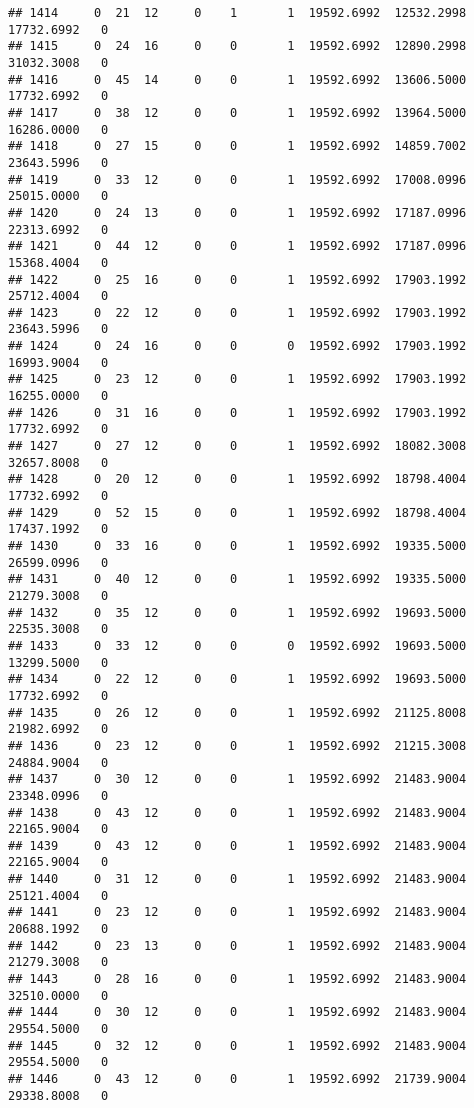 \documentclass[
]{article}
\begin{document}
\begin{enumerate}
\begin{verbatim}
## 1414     0  21  12     0    1       1  19592.6992  12532.2998  17732.6992   0
## 1415     0  24  16     0    0       1  19592.6992  12890.2998  31032.3008   0
## 1416     0  45  14     0    0       1  19592.6992  13606.5000  17732.6992   0
## 1417     0  38  12     0    0       1  19592.6992  13964.5000  16286.0000   0
## 1418     0  27  15     0    0       1  19592.6992  14859.7002  23643.5996   0
## 1419     0  33  12     0    0       1  19592.6992  17008.0996  25015.0000   0
## 1420     0  24  13     0    0       1  19592.6992  17187.0996  22313.6992   0
## 1421     0  44  12     0    0       1  19592.6992  17187.0996  15368.4004   0
## 1422     0  25  16     0    0       1  19592.6992  17903.1992  25712.4004   0
## 1423     0  22  12     0    0       1  19592.6992  17903.1992  23643.5996   0
## 1424     0  24  16     0    0       0  19592.6992  17903.1992  16993.9004   0
## 1425     0  23  12     0    0       1  19592.6992  17903.1992  16255.0000   0
## 1426     0  31  16     0    0       1  19592.6992  17903.1992  17732.6992   0
## 1427     0  27  12     0    0       1  19592.6992  18082.3008  32657.8008   0
## 1428     0  20  12     0    0       1  19592.6992  18798.4004  17732.6992   0
## 1429     0  52  15     0    0       1  19592.6992  18798.4004  17437.1992   0
## 1430     0  33  16     0    0       1  19592.6992  19335.5000  26599.0996   0
## 1431     0  40  12     0    0       1  19592.6992  19335.5000  21279.3008   0
## 1432     0  35  12     0    0       1  19592.6992  19693.5000  22535.3008   0
## 1433     0  33  12     0    0       0  19592.6992  19693.5000  13299.5000   0
## 1434     0  22  12     0    0       1  19592.6992  19693.5000  17732.6992   0
## 1435     0  26  12     0    0       1  19592.6992  21125.8008  21982.6992   0
## 1436     0  23  12     0    0       1  19592.6992  21215.3008  24884.9004   0
## 1437     0  30  12     0    0       1  19592.6992  21483.9004  23348.0996   0
## 1438     0  43  12     0    0       1  19592.6992  21483.9004  22165.9004   0
## 1439     0  43  12     0    0       1  19592.6992  21483.9004  22165.9004   0
## 1440     0  31  12     0    0       1  19592.6992  21483.9004  25121.4004   0
## 1441     0  23  12     0    0       1  19592.6992  21483.9004  20688.1992   0
## 1442     0  23  13     0    0       1  19592.6992  21483.9004  21279.3008   0
## 1443     0  28  16     0    0       1  19592.6992  21483.9004  32510.0000   0
## 1444     0  30  12     0    0       1  19592.6992  21483.9004  29554.5000   0
## 1445     0  32  12     0    0       1  19592.6992  21483.9004  29554.5000   0
## 1446     0  43  12     0    0       1  19592.6992  21739.9004  29338.8008   0

\end{verbatim}
\end{enumerate}
\end{document}
